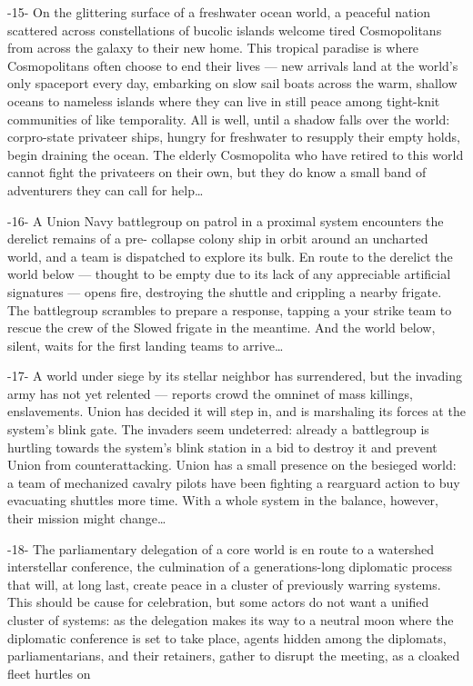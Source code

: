                                                     -15-
On the glittering surface of a freshwater ocean world, a peaceful nation scattered across
constellations of bucolic islands welcome tired Cosmopolitans from across the galaxy to their
new home. This tropical paradise is where Cosmopolitans often choose to end their lives — new
arrivals land at the world’s only spaceport every day, embarking on slow sail boats across the
warm, shallow oceans to nameless islands where they can live in still peace among tight-knit
communities of like temporality. All is well, until a shadow falls over the world: corpro-state
privateer ships, hungry for freshwater to resupply their empty holds, begin draining the ocean.
The elderly Cosmopolita who have retired to this world cannot fight the privateers on their own,
but they do know a small band of adventurers they can call for help…

                                                    -16-
A Union Navy battlegroup on patrol in a proximal system encounters the derelict remains of a pre-
collapse colony ship in orbit around an uncharted world, and a team is dispatched to explore its
bulk. En route to the derelict the world below — thought to be empty due to its lack of any
appreciable artificial signatures — opens fire, destroying the shuttle and crippling a nearby frigate.
The battlegroup scrambles to prepare a response, tapping a your strike team to rescue the crew
of the Slowed frigate in the meantime. And the world below, silent, waits for the first landing
teams to arrive…

                                                    -17-
A world under siege by its stellar neighbor has surrendered, but the invading army has not yet
relented — reports crowd the omninet of mass killings, enslavements. Union has decided it will
step in, and is marshaling its forces at the system’s blink gate. The invaders seem undeterred:
already a battlegroup is hurtling towards the system’s blink station in a bid to destroy it and
prevent Union from counterattacking. Union has a small presence on the besieged world: a team
of mechanized cavalry pilots have been fighting a rearguard action to buy evacuating shuttles
more time. With a whole system in the balance, however, their mission might change…

                                                    -18-
The parliamentary delegation of a core world is en route to a watershed interstellar conference,
the culmination of a generations-long diplomatic process that will, at long last, create peace in a
cluster of previously warring systems. This should be cause for celebration, but some actors do
not want a unified cluster of systems: as the delegation makes its way to a neutral moon where
the diplomatic conference is set to take place, agents hidden among the diplomats,
parliamentarians, and their retainers, gather to disrupt the meeting, as a cloaked fleet hurtles on




